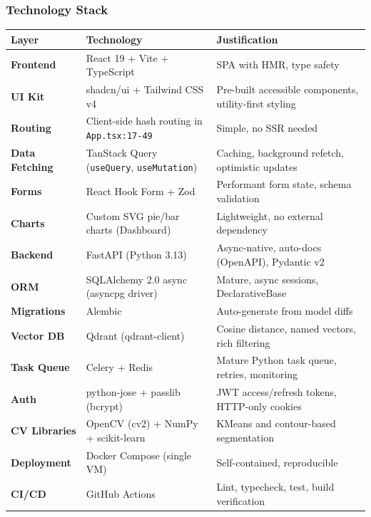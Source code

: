 \subsubsection{Technology Stack}\label{technology-stack}

\begin{center}
\begin{tabular}{@{}p{3cm} p{4.5cm} p{6.5cm}@{}}
\toprule
\textbf{Layer} & \textbf{Technology} & \textbf{Justification} \\
\midrule
\textbf{Frontend} & React 19 + Vite + TypeScript & SPA with HMR, type safety \\
\textbf{UI Kit} & shadcn/ui + Tailwind CSS v4 & Pre-built accessible components, utility-first styling \\
\textbf{Routing} & Client-side hash routing in \texttt{App.tsx:17-49} & Simple, no SSR needed \\
\textbf{Data Fetching} & TanStack Query (\texttt{useQuery}, \texttt{useMutation}) & Caching, background refetch, optimistic updates \\
\textbf{Forms} & React Hook Form + Zod & Performant form state, schema validation \\
\textbf{Charts} & Custom SVG pie/bar charts (Dashboard) & Lightweight, no external dependency \\
\textbf{Backend} & FastAPI (Python 3.13) & Async-native, auto-docs (OpenAPI), Pydantic v2 \\
\textbf{ORM} & SQLAlchemy 2.0 async (asyncpg driver) & Mature, async sessions, DeclarativeBase \\
\textbf{Migrations} & Alembic & Auto-generate from model diffs \\
\textbf{Vector DB} & Qdrant (qdrant-client) & Cosine distance, named vectors, rich filtering \\
\textbf{Task Queue} & Celery + Redis & Mature Python task queue, retries, monitoring \\
\textbf{Auth} & python-jose + passlib (bcrypt) & JWT access/refresh tokens, HTTP-only cookies \\
\textbf{CV Libraries} & OpenCV (cv2) + NumPy + scikit-learn & KMeans and contour-based segmentation \\
\textbf{Deployment} & Docker Compose (single VM) & Self-contained, reproducible \\
\textbf{CI/CD} & GitHub Actions & Lint, typecheck, test, build verification \\
\bottomrule
\end{tabular}
\end{center}


